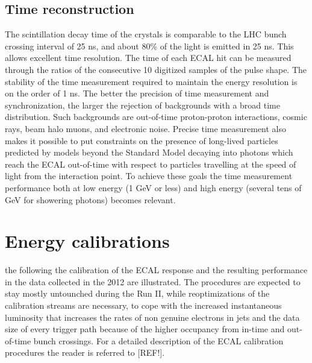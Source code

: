\documentclass[journal]{IEEEtran}
\begin{document}
\subsection{Time reconstruction}
The scintillation decay time of the crystals is comparable to the LHC bunch crossing interval of 25 ns, and about 80\% of the light is emitted in 25 ns. This allows excellent time resolution. The time of each ECAL hit can be measured through the ratios of the consecutive 10 digitized samples of the pulse shape.  The stability of the time measurement required to maintain the energy resolution is on the order of 1 ns. The better the precision of time measurement and synchronization, the larger the rejection of backgrounds with a broad time distribution. Such backgrounds are out-of-time proton-proton interactions, cosmic rays, beam halo muons, and electronic noise. Precise time measurement also makes it possible to put constraints on the presence of long-lived particles predicted by models beyond the Standard Model decaying into photons which reach the ECAL  out-of-time with respect to particles travelling at the speed of light from the interaction point. To achieve these goals the time measurement performance both at low energy (1 GeV or less) and high energy (several tens of GeV for showering photons) becomes relevant.

\section{Energy calibrations}
 the following the calibration of the ECAL response and the resulting performance in the data collected in the 2012 are illustrated. The procedures are expected to stay mostly untounched during the Run II, while reoptimizations of the calibration streams are necessary, to cope with the increased instantaneous luminosity that increases the rates of non genuine electrons in jets and the data size of every trigger path because of the higher occupancy from in-time and out-of-time bunch crossings. For a detailed description of the ECAL calibration procedures the reader is referred to [REF!].
\end{document}
